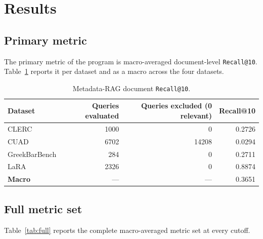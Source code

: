 \documentclass[11pt,a4paper]{article}
\begin{document}
\section{Results}\label{sec:results}

\subsection{Primary metric}
The primary metric of the program is macro-averaged document-level
\texttt{Recall@10}. Table~\ref{tab:primary} reports it per dataset
and as a macro across the four datasets.

\begin{table}[h]
\centering
\caption{Metadata-RAG document \texttt{Recall@10}.}
\label{tab:primary}
\small
\begin{tabular}{l r r r}
\toprule
\textbf{Dataset} & \textbf{Queries evaluated}
  & \textbf{Queries excluded (0 relevant)}
  & \textbf{Recall@10} \\
\midrule
CLERC              & \num{1000} & \num{0}     & \num{0.2726} \\
CUAD               & \num{6702} & \num{14208} & \num{0.0294} \\
GreekBarBench      & \num{284}  & \num{0}     & \num{0.2711} \\
LaRA               & \num{2326} & \num{0}     & \num{0.8874} \\
\midrule
\textbf{Macro}     & ---        & ---         & \num{0.3651} \\
\bottomrule
\end{tabular}
\end{table}

\subsection{Full metric set}
Table~\ref{tab:full} reports the complete macro-averaged metric set
at every cutoff.
\end{document}

